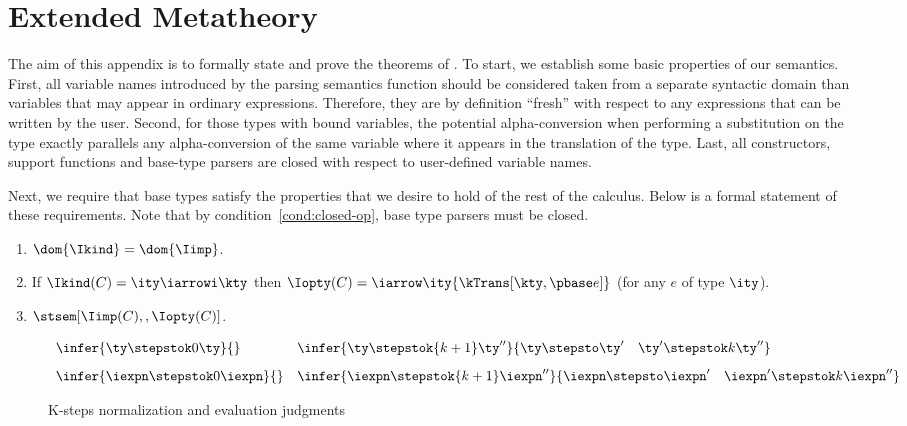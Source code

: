 \appendix
\section{Extended Metatheory}
\label{app:ddc-meta-theory}

The aim of this appendix is to formally state and prove the theorems of . To start, we establish some basic properties of our semantics. First, all variable names introduced by the parsing semantics function should be considered taken from a separate syntactic domain than variables that may appear in ordinary expressions.  Therefore, they are by definition ``fresh'' with respect to any expressions that can be written by the user.  Second, for those types with bound variables, the potential alpha-conversion when performing a substitution on the type exactly parallels any alpha-conversion of the same variable where it appears in the translation of the type. Last, all constructors, support functions and base-type parsers are closed with respect to user-defined variable names.

Next, we require that \ddc{} base types satisfy the properties that we
desire to hold of the rest of the calculus.  Below is a formal
statement of these requirements. Note that by
condition~\ref{cond:closed-op}, base type parsers must be closed.
\begin{condition}
\label{cond:base-types}
  \begin{enumerate}
  \item $\dom {\Ikind} = \dom {\Iimp}$.
  \item If $\Ikind(C) = {\ity \iarrowi \kty}$ then $\Iopty(C) =
    \iarrow \ity {\kTrans[\kty,\pbase e]}$ (for any $e$ of type $\ity$).
  \item $\stsem[\Iimp(C),,\Iopty(C)]$.
    \label{cond:closed-op}
  \end{enumerate}
\end{condition}

\begin{figure}[t]
\[ 
\begin{array}{ll}
  \infer{\ty \stepstok 0 \ty}{} \qquad
  &
  \infer{\ty \stepstok {k+1} \ty''}
  {\ty \stepsto \ty' \quad \ty' \stepstok k \ty''}
\\[2ex]
  \infer{\iexpn \stepstok 0 \iexpn}{} 
&
 \infer{\iexpn \stepstok {k+1} \iexpn''}
  {\iexpn \stepsto \iexpn' \quad \iexpn' \stepstok k \iexpn''}
\end{array}
\]
\caption{K-steps normalization and evaluation judgments}
\label{fig:k-steps-norm-eval}
\end{figure}

